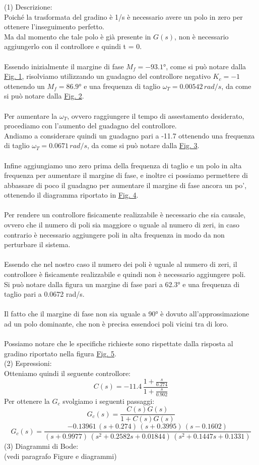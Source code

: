 (1) Descrizione: \\
Poiché la trasformata del gradino è 1/s è necessario avere un polo in zero per ottenere l'inseguimento perfetto.\\ 
Ma dal momento che tale polo è già presente in $G(s)$, non è necessario
aggiungerlo con il controllore e quindi t = 0. \\ \\
Essendo inizialmente il margine di fase $M_f=-93.1°$, come si può notare dalla \hyperref[fig:fig1]{Fig. 1}, risolviamo utilizzando un guadagno del controllore negativo $K_c=-1$ ottenendo un $M_f=86.9°$ e una frequenza di taglio $\omega_T = 0.00542 \, rad/s$, da come si può notare dalla \hyperref[fig:fig2]{Fig. 2}.\\ \\
Per aumentare la $\omega_T$, ovvero raggiungere il tempo di assestamento desiderato, procediamo con l'aumento del guadagno del controllore. \\
Andiamo a considerare quindi un guadagno pari a -11.7 ottenendo una frequenza di taglio $\omega_T=0.0671 \, rad/s$, da come si può notare dalla \hyperref[fig:fig3]{Fig. 3}.\\ \\
Infine aggiungiamo uno zero prima della frequenza di taglio e un polo in alta frequenza per aumentare il margine di fase, e inoltre ci possiamo permettere di abbassare di poco il guadagno per aumentare il margine di fase ancora un po', ottenendo il diagramma riportato in \hyperref[fig:fig4]{Fig. 4}.\\ \\
Per rendere un controllore fisicamente realizzabile è necessario che sia causale, ovvero che il numero di poli sia maggiore o uguale al numero di zeri, in caso contrario è necessario aggiungere poli in alta frequenza in modo da non perturbare il sistema. \\ \\
Essendo che nel nostro caso il numero dei poli è uguale al numero di zeri, il controllore è fisicamente realizzabile e quindi non è necessario aggiungere poli. \\
Si può notare dalla figura un margine di fase pari a 62.3° e una frequenza di taglio pari a 0.0672 rad/s.\\ \\
Il fatto che il margine di fase non sia uguale a 90° è dovuto all'approssimazione ad un polo dominante, che non è precisa essendoci poli vicini tra di loro.\\ \\
Possiamo notare che le specifiche richieste sono rispettate dalla risposta al gradino riportato nella figura \hyperref[fig:fig5]{Fig. 5}. \\

(2) Espressioni: \\
Otteniamo quindi il seguente controllore: $$C(s) = -11.4 \, \frac{1+\frac{s}{0.274}}{1+\frac{s}{0.902}}$$
Per ottenere la $G_c$ svolgiamo i seguenti passaggi:
$$G_c(s)=\frac{C(s)G(s)}{1+C(s)G(s)}$$
$$G_c(s)=\frac{-0.13961 \, (s+0.274)\,(s+0.3995)\,(s-0.1602)}{(s+0.9977)\,(s^2+0.2582s+0.01844)\,(s^2+0.1447s+0.1331)}$$ 
(3) Diagrammi di Bode: \\
(vedi paragrafo Figure e diagrammi)